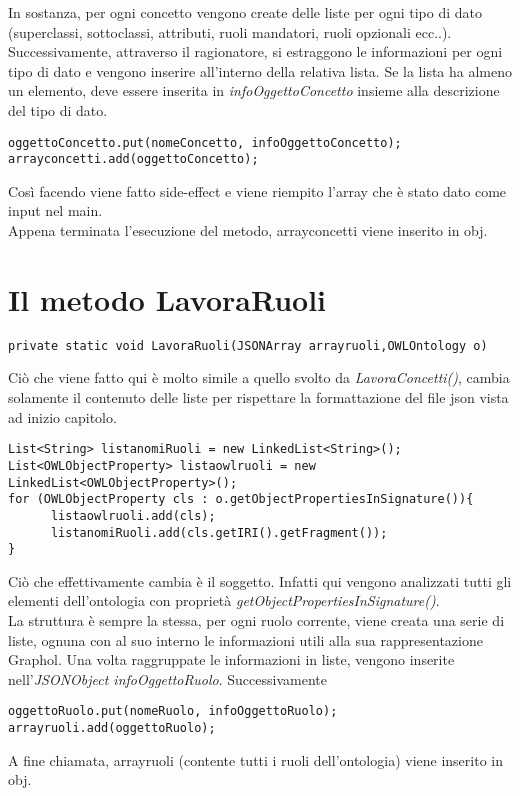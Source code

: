 \documentclass[Lau,binding=0.6cm]{sapthesis}
\begin{document}
In sostanza, per ogni concetto vengono create delle liste per ogni tipo di dato (superclassi, sottoclassi, attributi, ruoli mandatori, ruoli opzionali ecc..). Successivamente, attraverso il ragionatore, si estraggono le informazioni per ogni tipo di dato e vengono inserire all'interno della relativa lista. Se la lista ha almeno un elemento, deve essere inserita in  \textit{infoOggettoConcetto} insieme alla descrizione del tipo di dato.

\begin{verbatim}
oggettoConcetto.put(nomeConcetto, infoOggettoConcetto);
arrayconcetti.add(oggettoConcetto);
\end{verbatim}

Così facendo viene fatto side-effect e viene riempito l'array che è stato dato come input nel main.
\\Appena terminata l'esecuzione del metodo, arrayconcetti viene inserito in obj.
\section{Il metodo LavoraRuoli}
\begin{verbatim}
private static void LavoraRuoli(JSONArray arrayruoli,OWLOntology o)
\end{verbatim}
Ciò che viene fatto qui è molto simile a quello svolto da \textit{LavoraConcetti()}, cambia solamente il contenuto delle liste per rispettare la formattazione del file json vista ad inizio capitolo.
\\\begin{verbatim}
List<String> listanomiRuoli = new LinkedList<String>();
List<OWLObjectProperty> listaowlruoli = new LinkedList<OWLObjectProperty>();
for (OWLObjectProperty cls : o.getObjectPropertiesInSignature()){
      listaowlruoli.add(cls);
      listanomiRuoli.add(cls.getIRI().getFragment());
}
\end{verbatim}
Ciò che effettivamente cambia è il soggetto. Infatti qui vengono analizzati tutti gli elementi dell'ontologia con proprietà \textit{getObjectPropertiesInSignature()}.
\\La struttura è sempre la stessa, per ogni ruolo corrente, viene creata una serie di liste, ognuna con al suo interno le informazioni utili alla sua rappresentazione Graphol. Una volta raggruppate le informazioni in liste, vengono inserite nell'\textit{JSONObject infoOggettoRuolo}. Successivamente
\begin{verbatim}
oggettoRuolo.put(nomeRuolo, infoOggettoRuolo);
arrayruoli.add(oggettoRuolo);
\end{verbatim}
A fine chiamata, arrayruoli (contente tutti i ruoli dell'ontologia) viene inserito in obj.
\end{document}
